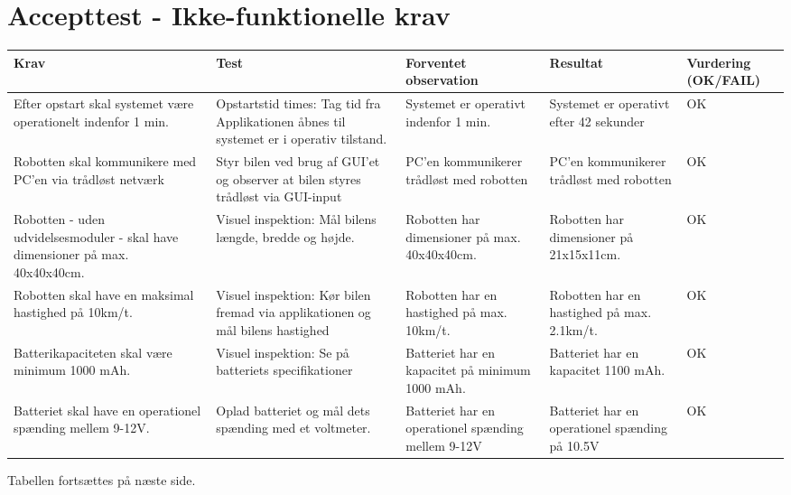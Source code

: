 \section{Accepttest - Ikke-funktionelle krav}
	\begin{tabu}{ X[l,1] X[l,1] X[l,1] X[l,1] X[l,0.9]} 
	\hline
	\textbf{Krav} & \textbf{Test} & \textbf{Forventet observation} & \textbf{Resultat} & \textbf{Vurdering (OK/FAIL)} \\
	\hline
	Efter opstart skal systemet være operationelt indenfor 1 min. & Opstartstid times: Tag tid fra Applikationen åbnes til systemet er i operativ tilstand. & Systemet er operativt indenfor 1 min. & Systemet er operativt efter 42 sekunder & OK \\
	\hdashline
	Robotten skal kommunikere med PC'en via trådløst netværk & Styr bilen ved brug af GUI'et og observer at bilen styres trådløst via GUI-input & PC'en kommunikerer trådløst med robotten & PC'en kommunikerer trådløst med robotten & OK \\
	\hdashline
	Robotten - uden udvidelsesmoduler - skal have dimensioner på max. 40x40x40cm. & Visuel inspektion: Mål bilens længde, bredde og højde. & Robotten har dimensioner på max. 40x40x40cm. & Robotten har dimensioner på 21x15x11cm. & OK \\
	\hdashline
	Robotten skal have en maksimal hastighed på 10km/t. & Visuel inspektion: Kør bilen fremad via applikationen og mål bilens hastighed & Robotten har en hastighed på max. 10km/t. & Robotten har en hastighed på max. 2.1km/t. & OK \\
	\hdashline
	Batterikapaciteten skal være minimum 1000 mAh. & Visuel inspektion: Se på batteriets specifikationer & Batteriet har en kapacitet på minimum 1000 mAh. & Batteriet har en kapacitet 1100 mAh. & OK \\
	\hdashline
	Batteriet skal have en operationel spænding mellem 9-12V. & Oplad batteriet og mål dets spænding med et voltmeter.  & Batteriet har en operationel spænding mellem 9-12V &Batteriet har en operationel spænding på 10.5V & OK \\
	\hline
	\end{tabu}

Tabellen fortsættes på næste side.
	
